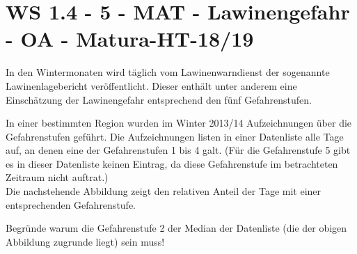 \section{WS 1.4 - 5 - MAT - Lawinengefahr - OA - Matura-HT-18/19}

\begin{beispiel}[WS 1.4]{1}
In den Wintermonaten wird täglich vom Lawinenwarndienst der sogenannte Lawinenlagebericht
veröffentlicht. Dieser enthält unter anderem eine Einschätzung der Lawinengefahr entsprechend
den fünf Gefahrenstufen.\leer

In einer bestimmten Region wurden im Winter 2013/14 Aufzeichnungen über die Gefahrenstufen
geführt. Die Aufzeichnungen listen in einer Datenliste alle Tage auf, an denen eine der Gefahrenstufen 1 bis 4 galt. (Für die Gefahrenstufe 5 gibt es in dieser Datenliste keinen Eintrag, da diese Gefahrenstufe im betrachteten Zeitraum nicht auftrat.)\\
Die nachstehende Abbildung zeigt den relativen Anteil der Tage mit einer entsprechenden Gefahrenstufe.\leer

\begin{center}
\end{center}

Begründe warum die Gefahrenstufe 2 der Median der Datenliste (die der obigen Abbildung zugrunde liegt) sein muss!

\end{beispiel}